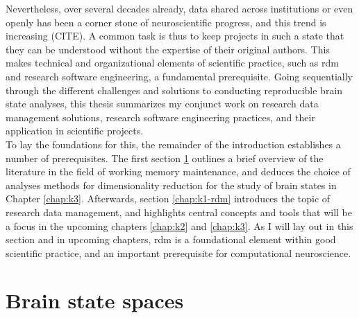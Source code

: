 Nevertheless, over several decades already, data shared across institutions or even openly has been a corner stone of neuroscientific progress, and this trend is increasing (CITE).
A common task is thus to keep projects in such a state that they can be understood without the expertise of their original authors.
This makes technical and organizational elements of scientific practice, such as \gls{rdm} and research software engineering, a fundamental prerequisite.
Going sequentially through the different challenges and solutions to conducting reproducible brain state analyses, this thesis summarizes my conjunct work on research data management solutions, research software engineering practices, and their application in scientific projects.\\
To lay the foundations for this, the remainder of the introduction establishes a number of prerequisites.
The first section \ref{chap:k1-brain} outlines a brief overview of the literature in the field of working memory maintenance, and deduces the choice of analyses methods for dimensionality reduction for the study of brain states in Chapter \ref{chap:k3}.
Afterwards, section \ref{chap:k1-rdm} introduces the topic of research data management, and highlights central concepts and tools that will be a focus in the upcoming chapters \ref{chap:k2} and \ref{chap:k3}.
As I will lay out in this section and in upcoming chapters, \gls{rdm} is a foundational element within good scientific practice, and an important prerequisite for computational neuroscience.

\section{Brain state spaces}
\label{chap:k1-brain}

